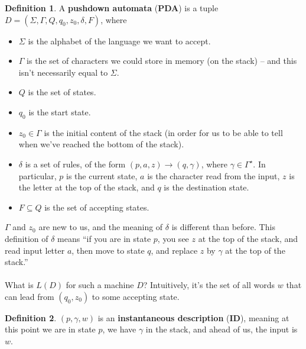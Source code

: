 \documentclass[]{article}
\theoremstyle{definition}
\newtheorem*{defn}{Definition}
\begin{document}
      \begin{defn}
        A \textbf{pushdown automata} (\textbf{PDA}) is a tuple $D = (\Sigma, \Gamma, Q, q_0, z_0, \delta, F)$, where
        \begin{itemize}
          \item $\Sigma$ is the alphabet of the language we want to accept.
          \item $\Gamma$ is the set of characters we could store in memory (on the stack) -- and this isn't necessarily equal to $\Sigma$.
          \item $Q$ is the set of states.
          \item $q_0$ is the start state.
          \item $z_0 \in \Gamma$ is the initial content of the stack (in order for us to be able to tell when we've reached the bottom of the stack).
          \item $\delta$ is a set of rules, of the form $(p, a, z) \to (q, \gamma)$, where $\gamma \in \Gamma^\star$. In particular, $p$ is the current state, $a$ is the character read from the input, $z$ is the letter at the top of the stack, and $q$ is the destination state.
          \item $F \subseteq Q$ is the set of accepting states.
        \end{itemize}
      \end{defn}

      $\Gamma$ and $z_0$ are new to us, and the meaning of $\delta$ is different than before. This definition of $\delta$ means ``if you are in state $p$, you see $z$ at the top of the stack, and read input letter $a$, then move to state $q$, and replace $z$ by $\gamma$ at the top of the stack.''
      \\ \\
      What is $L(D)$ for such a machine $D$? Intuitively, it's the set of all words $w$ that can lead from $(q_0, z_0)$ to some accepting state.

      \begin{defn}
        $(p, \gamma, w)$ is an \textbf{instantaneous description} (\textbf{ID}), meaning at this point we are in state $p$, we have $\gamma$ in the stack, and ahead of us, the input is $w$.
      \end{defn}
\end{document}
